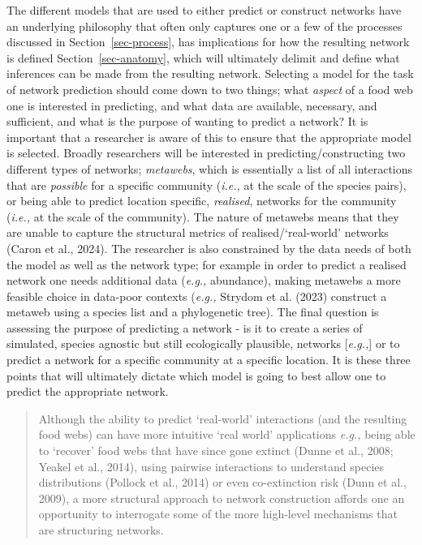 \documentclass[
]{article}
\begin{document}
The different models that are used to either predict or construct
networks have an underlying philosophy that often only captures one or a
few of the processes discussed in Section~\ref{sec-process}, has
implications for how the resulting network is defined
Section~\ref{sec-anatomy}, which will ultimately delimit and define what
inferences can be made from the resulting network. Selecting a model for
the task of network prediction should come down to two things; what
\emph{aspect} of a food web one is interested in predicting, and what
data are available, necessary, and sufficient, and what is the purpose
of wanting to predict a network? It is important that a researcher is
aware of this to ensure that the appropriate model is selected. Broadly
researchers will be interested in predicting/constructing two different
types of networks; \emph{metawebs}, which is essentially a list of all
interactions that are \emph{possible} for a specific community
(\emph{i.e.,} at the scale of the species pairs), or being able to
predict location specific, \emph{realised}, networks for the community
(\emph{i.e.,} at the scale of the community). The nature of metawebs
means that they are unable to capture the structural metrics of
realised/`real-world' networks (Caron et al., 2024). The researcher is
also constrained by the data needs of both the model as well as the
network type; for example in order to predict a realised network one
needs additional data (\emph{e.g.,} abundance), making metawebs a more
feasible choice in data-poor contexts (\emph{e.g.,} Strydom et al.
(2023) construct a metaweb using a species list and a phylogenetic
tree). The final question is assessing the purpose of predicting a
network - is it to create a series of simulated, species agnostic but
still ecologically plausible, networks {[}\emph{e.g.,}{]} or to predict
a network for a specific community at a specific location. It is these
three points that will ultimately dictate which model is going to best
allow one to predict the appropriate network.

\begin{quote}
Although the ability to predict `real-world' interactions (and the
resulting food webs) can have more intuitive `real world' applications
\emph{e.g.,} being able to `recover' food webs that have since gone
extinct (Dunne et al., 2008; Yeakel et al., 2014), using pairwise
interactions to understand species distributions (Pollock et al., 2014)
or even co-extinction risk (Dunn et al., 2009), a more structural
approach to network construction affords one an opportunity to
interrogate some of the more high-level mechanisms that are structuring
networks.
\end{quote}
\end{document}
